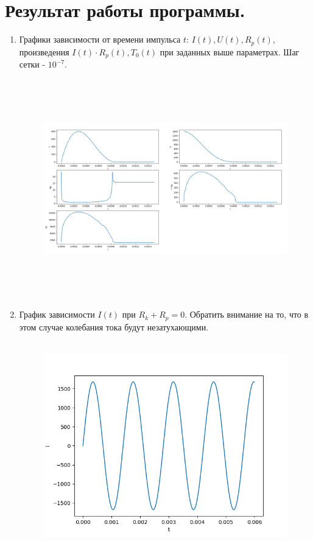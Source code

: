 \section*{Результат работы программы.}
\begin{enumerate}
	\item Графики зависимости от времени импульса $t$: $I(t), U(t), R_p(t),$ произведения $I(t) \cdot R_p(t), T_0(t)$ при заданных выше параметрах.
	Шаг сетки - $10^{-7}$.
	
	\begin{figure}[h]
		\begin{center}
			{\includegraphics[height=9.5cm, width = 18cm]{tasks/task_1}}
		\end{center}
	\end{figure}
	
	\item График зависимости $I(t)$ при $R_k + R_p = 0$. Обратить внимание на то, что в этом случае колебания тока будут незатухающими.
	
	\begin{figure}[h]
		\begin{center}
			{\includegraphics[height=9cm, width = 16cm]{tasks/task_2}}
		\end{center}
	\end{figure}
	

\end{enumerate}
